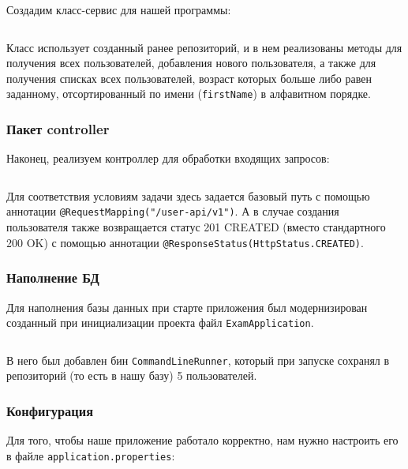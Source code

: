 \documentclass[a4paper, 14pt]{article}
\begin{document}
Создадим класс-сервис для нашей программы:

\normalsize
\inputminted[frame=single]{Java}{../src/main/java/ru/vspochernin/exam/service/UserService.java}
\large

Класс использует созданный ранее репозиторий, и в нем реализованы методы для получения всех пользователей, добавления нового пользователя, а также для получения списках всех пользователей, возраст которых больше либо равен заданному, отсортированный по имени (\texttt{firstName}) в алфавитном порядке.

\subsubsection{Пакет controller}

Наконец, реализуем контроллер для обработки входящих запросов:

\normalsize
\inputminted[frame=single]{Java}{../src/main/java/ru/vspochernin/exam/controller/UserController.java}
\large

Для соответствия условиям задачи здесь задается базовый путь с помощью аннотации \texttt{@RequestMapping("/user-api/v1")}. А в случае создания пользователя также возвращается статус 201 CREATED (вместо стандартного 200 OK) с помощью аннотации \texttt{@ResponseStatus(HttpStatus.CREATED)}.

\subsubsection{Наполнение БД}

Для наполнения базы данных при старте приложения был модернизирован созданный при инициализации проекта файл \texttt{ExamApplication}.

\normalsize
\inputminted[frame=single]{Java}{../src/main/java/ru/vspochernin/exam/ExamApplication.java}
\large

В него был добавлен бин \texttt{CommandLineRunner}, который при запуске сохранял в репозиторий (то есть в нашу базу) 5 пользователей.

\subsubsection{Конфигурация}

Для того, чтобы наше приложение работало корректно, нам нужно настроить его в файле \texttt{application.properties}:

\normalsize
\inputminted[frame=single]{properties}{../src/main/resources/application.properties}
\large
\end{document}
